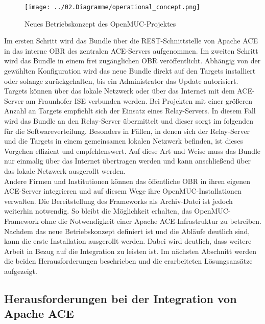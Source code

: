 \begin{figure}[ht]
 \centering
 \texttt{[image: ../02.Diagramme/operational\_concept.png]}
 \caption{Neues Betriebskonzept des OpenMUC-Projektes}
 \label{fig:operational_concept_openmuc}
\end{figure}

Im ersten Schritt wird das Bundle über die REST-Schnittstelle von Apache ACE in das interne OBR des zentralen ACE-Servers aufgenommen. 
Im zweiten Schritt wird das Bundle in einem frei zugänglichen \ac{OBR} veröffentlicht. 
Abhängig von der gewählten Konfiguration wird das neue Bundle direkt auf den Targets installiert oder solange zurückgehalten, bis ein 
Administrator das Update autorisiert.\\

Targets können über das lokale Netzwerk oder über das Internet mit dem ACE-Server am Fraunhofer ISE verbunden werden.
Bei Projekten mit einer größeren Anzahl an Targets empfiehlt sich der Einsatz eines Relay-Servers. 
In diesem Fall wird das Bundle an den Relay-Server übermittelt und dieser sorgt im folgenden für die Softwareverteilung.
Besonders in Fällen, in denen sich der Relay-Server und die Targets in einem gemeinsamen lokalen Netzwerk befinden, ist dieses Vorgehen effizient und empfehlenswert.
Auf diese Art und Weise muss das Bundle nur einmalig über das Internet übertragen werden und kann anschließend über das lokale Netzwerk ausgerollt werden.\\

Andere Firmen und Institutionen können das öffentliche \ac{OBR} in ihren eigenen ACE-Server integrieren und auf diesem Wege ihre OpenMUC-Installationen verwalten.
Die Bereitstellung des Frameworks als Archiv-Datei ist jedoch weiterhin notwendig.
So bleibt die Möglichkeit erhalten, das OpenMUC-Framework ohne die Notwendigkeit einer Apache ACE-Infrastruktur zu betreiben.\\

Nachdem das neue Betriebskonzept definiert ist und die Abläufe deutlich sind, kann die erste Installation ausgerollt werden.
Dabei wird deutlich, dass weitere Arbeit in Bezug auf die Integration zu leisten ist. 
Im nächsten Abschnitt werden die beiden Herausforderungen beschrieben und die erarbeiteten Lösungsansätze aufgezeigt.

\subsection{Herausforderungen bei der Integration von Apache ACE}

